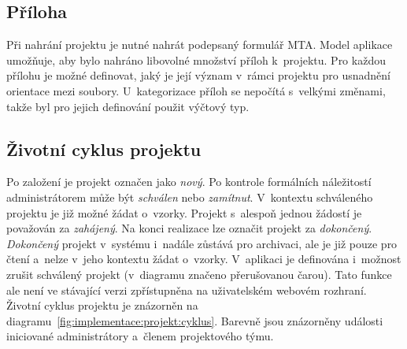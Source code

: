 \documentclass[11pt, draft, oneside]{fithesis2}
\begin{document}
\subsection{Příloha}
Při nahrání projektu je nutné nahrát podepsaný formulář MTA. Model aplikace umožňuje, aby bylo nahráno libovolné množství příloh k~projektu. Pro každou přílohu je možné definovat, jaký je její význam v~rámci projektu pro usnadnění orientace mezi soubory. U~kategorizace příloh se nepočítá s~velkými změnami, takže byl pro jejich definování použit výčtový typ.

\subsection{Životní cyklus projektu}
Po založení je projekt označen jako \textit{nový}. Po kontrole formálních náležitostí administrátorem může být \textit{schválen} nebo \textit{zamítnut}. V~kontextu schváleného projektu je již možné žádat o~vzorky. Projekt s~alespoň jednou žádostí je považován za \textit{zahájený}. Na konci realizace lze označit projekt za \textit{dokončený}. \textit{Dokončený} projekt v~systému i~nadále zůstává pro archivaci, ale je již pouze pro čtení a~nelze v~jeho kontextu žádat o~vzorky. 
V~aplikaci je definována i~možnost zrušit schválený projekt (v~diagramu značeno přerušovanou čarou). Tato funkce ale není ve stávající verzi zpřístupněna na uživatelském webovém rozhraní. Životní cyklus projektu je znázorněn na diagramu~\ref{fig:implementace:projekt:cyklus}. Barevně jsou znázorněny události iniciované {\color{palatinatepurple}administrátory} a~{\color{cyan}členem projektového týmu}. 
\end{document}
